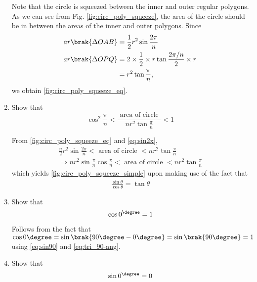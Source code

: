 \begin{enumerate}[label=\arabic*.,ref=\thesubsection.\theenumi]
\solution Note that the circle is squeezed between the inner and outer regular polygons.  As we can see from Fig. \ref{fig:circ_poly_squeeze}, the area of the circle should be in between the areas of the inner and outer polygons.  Since
%
\begin{align}
ar \brak{\Delta OAB} &= \frac{1}{2}r^{2}\sin\frac{2\pi}{n} \\
ar \brak{\Delta OPQ} &= 2 \times \frac{1}{2} \times r \tan\frac{2\pi/n}{2} \times r \\
&= r^{2}\tan\frac{\pi}{n},
\end{align}
%
we obtain \eqref{fig:circ_poly_squeeze_eq}.
%
\item
Show that
	\begin{equation}
	\label{fig:circ_poly_squeeze_simple}
\cos^2\frac{\pi}{n} < \frac{\text{ area of circle }}{nr^{2}\tan\frac{\pi}{n}} < 1	\end{equation}

\solution From \eqref{fig:circ_poly_squeeze_eq} and \eqref{eq:sin2x},
{\small
	\begin{align}
	\frac{n}{2}r^{2}\sin\frac{2\pi}{n} < \text{ area of circle } 
	< nr^{2}\tan\frac{\pi}{n} 
	\\
\Rightarrow 	
	{n}r^{2}\sin\frac{\pi}{n}\cos\frac{\pi}{n} < \text{ area of circle } 
	< nr^{2}\tan\frac{\pi}{n} 
	\end{align}
%
}
which yields 	\eqref{fig:circ_poly_squeeze_simple} upon making use of the fact that 
%
\begin{align}
\frac{\sin \theta}{\cos \theta} = \tan \theta
\end{align}
%

%
\item
	Show that 
	\begin{equation}
	\label{ch5_cos_zero}
	\cos 0^{\degree} = 1
	\end{equation}

\solution Follows from the fact that $\cos 0 \degree = \sin \brak{90\degree -0\degree} = \sin \brak{90\degree }=1$ using \eqref{eq:sin90} and \eqref{eq:tri_90-ang}.



\item
	Show that 
	\begin{equation}
	\label{ch5_sin_zero}
	\sin 0^{\degree} = 0
	\end{equation}


\end{enumerate}
